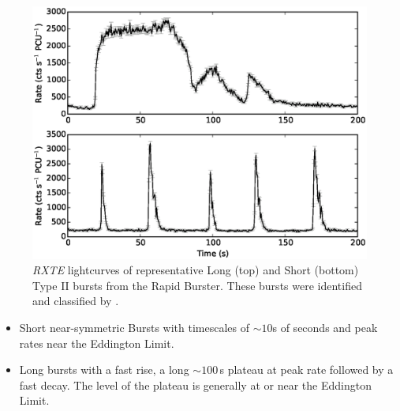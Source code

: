 \begin{figure}
  \centering
  \includegraphics[width=.9\linewidth, trim={0.8cm 0 1.4cm 0},clip]{images/bagnoli_bursts.eps}
  \caption[\textit{RXTE} lightcurves of representative Long (top) and Short (bottom) Type II bursts from the Rapid Burster.]{\small \indexrxte\textit{RXTE} lightcurves of representative Long (top) and Short (bottom) Type II bursts from the Rapid Burster.  These bursts were identified and classified by \citet{Bagnoli_PopStudy}.}
  \label{fig:bagnoli_lcs}
\end{figure}

\begin{itemize}
\item Short near-symmetric Bursts with timescales of $\sim10$s of seconds and peak rates near the Eddington Limit.
\item Long bursts with a fast rise, a long $\sim100$\,s plateau at peak rate followed by a fast decay.  The level of the plateau is generally at or near the Eddington Limit.
\end{itemize}

